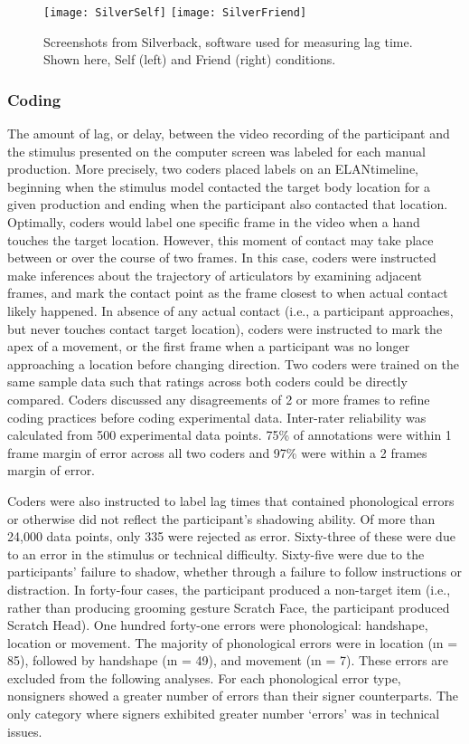  
            \begin{figure}[h] \centering
                \texttt{[image: SilverSelf]} \texttt{[image: SilverFriend]}  
                \caption[Silverback\txreg view]{Screenshots from Silverback\txreg, software used for measuring lag time. Shown here, Self (left) and Friend (right) conditions.} \label{fig:silver} 
            \end{figure} 

        \subsubsection{Coding}
            The amount of lag, or delay, between the video recording of the participant and the stimulus presented on the computer screen was labeled for each manual production. More precisely, two coders placed labels on an ELAN\txreg timeline, beginning when the stimulus model contacted the target body location for a given production and ending when the participant also contacted that location. Optimally, coders would label one specific frame in the video when a hand touches the target location. However, this moment of contact may take place between or over the course of two frames. In this case, coders were instructed make inferences about the trajectory of articulators by examining adjacent frames, and mark the contact point as the frame closest to when actual contact likely happened. In absence of any actual contact (i.e., a participant approaches, but never touches contact target location), coders were instructed to mark the apex of a movement, or the first frame when a participant was no longer approaching a location before changing direction.  Two coders were trained on the same sample data such that ratings across both coders could be directly compared. Coders discussed any disagreements of 2 or more frames to refine coding practices before coding experimental data. Inter-rater reliability was calculated from 500 experimental data points. 75\% of annotations were within 1 frame margin of error across all two coders and 97\% were within a 2 frames margin of error. \par
            Coders were also instructed to label lag times that contained phonological errors or otherwise did not reflect the participant’s shadowing ability. Of more than 24,000 data points, only 335 were rejected as error. Sixty-three of these were due to an error in the stimulus or technical difficulty. Sixty-five were due to the participants' failure to shadow, whether through a failure to follow instructions or distraction. In forty-four cases, the participant produced a non-target item (i.e., rather than producing grooming gesture Scratch Face, the participant produced Scratch Head). One hundred forty-one errors were phonological: handshape, location or movement. The majority of phonological errors were in location (\i{n} = 85), followed by handshape (\i{n} = 49), and movement (\i{n} = 7). These errors are excluded from the following analyses.  For each phonological error type, nonsigners showed a greater number of errors than their signer counterparts. The only category where signers exhibited greater number ‘errors’ was in technical issues.\par 
